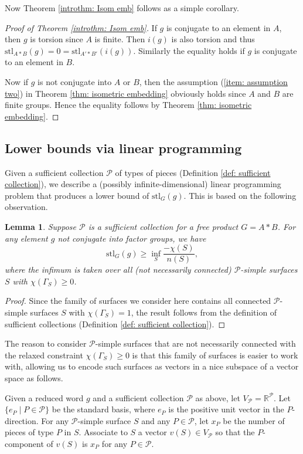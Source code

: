 \documentclass{amsart}
\newtheorem{lemma}[theorem]{Lemma}
\theoremstyle{definition}
\numberwithin{equation}{section}
\theoremstyle{theorem}
\theoremstyle{remark}
\def\R{\mathbb R}
\def\stl{\mathrm{stl}}
\begin{document}
	Now Theorem \ref{introthm: Isom emb} follows as a simple corollary.
	\begin{proof}[Proof of Theorem \ref{introthm: Isom emb}]
	    If $g$ is conjugate to an element in $A$, then $g$ is torsion since $A$ is finite. Then $i(g)$ is also torsion and thus $\stl_{A*B}(g)=0=\stl_{A'*B'}(i(g))$.
	    Similarly the equality holds if $g$ is conjugate to an element in $B$.
	    
	    Now if $g$ is not conjugate into $A$ or $B$, then the assumption (\ref{item: assumption two}) in Theorem \ref{thm: isometric embedding} obviously holds since $A$ and $B$ are finite groups. Hence the equality follows by Theorem \ref{thm: isometric embedding}.
	\end{proof}
	
	\subsection{Lower bounds via linear programming}\label{subsec: linprog lower bound}
	Given a sufficient collection $\mathcal{P}$ of types of pieces (Definition \ref{def: sufficient collection}),
	we describe a (possibly infinite-dimensional) linear programming problem that produces a lower bound of $\stl_G(g)$. 
	This is based on the following observation.
	
	\begin{lemma}\label{lemma: linprog estimate}
		Suppose $\mathcal{P}$ is a sufficient collection for a free product $G=A*B$. 
		For any element $g$ not conjugate into factor groups, we have
		$$\stl_G(g)\ge\inf_S\frac{-\chi(S)}{n(S)},$$
		where the infimum is taken over all (not necessarily connected) $\mathcal{P}$-simple surfaces $S$ with $\chi(\Gamma_S)\ge0$.
	\end{lemma}
	\begin{proof}
		Since the family of surfaces we consider here contains all connected $\mathcal{P}$-simple surfaces $S$ with $\chi(\Gamma_S)=1$, 
		the result follows from the definition of sufficient collections (Definition \ref{def: sufficient collection}).
	\end{proof}
	
	The reason to consider $\mathcal{P}$-simple surfaces that are not necessarily connected with the relaxed constraint $\chi(\Gamma_S)\ge0$ is that this family of surfaces is easier to work with, 
	allowing us to encode such surfaces as vectors in a nice subspace of a vector space as follows.
	
	Given a reduced word $g$ and a sufficient collection $\mathcal{P}$ as above, let $V_\mathcal{P}=\R^{\mathcal{P}}$. 
	Let $\{e_P\mid P\in\mathcal{P}\}$ be the standard basis, where $e_P$ is the positive unit vector in the $P$-direction.
	For any $\mathcal{P}$-simple surface $S$ and any $P\in \mathcal{P}$, let $x_P$ be the number of pieces of type $P$ in $S$. 
	Associate to $S$ a vector $v(S)\in V_\mathcal{P}$ so that the $P$-component of $v(S)$ is $x_P$ for any $P\in \mathcal{P}$.
	
\end{document}
